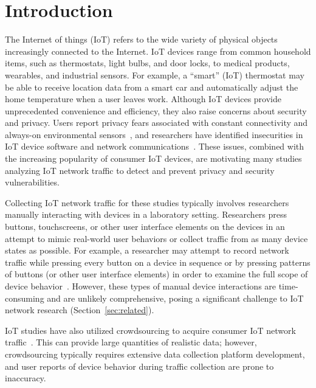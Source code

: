 \section{Introduction}
\label{sec:introduction}
The Internet of things (IoT) refers to the wide variety of physical objects increasingly connected to the Internet. IoT devices range from common household items, such as thermostats, light bulbs, and door locks, to medical products, wearables, and industrial sensors. For example, a ``smart'' (IoT) thermostat may be able to receive location data from a smart car and automatically adjust the home temperature when a user leaves work.
Although IoT devices provide unprecedented convenience and efficiency, they also raise concerns about security and privacy. Users report privacy fears associated with constant connectivity and always-on environmental sensors~\cite{naeini2017privacy, zheng2018user, apthorpe2020you, huang2020amazon}, and researchers have identified insecurities in IoT device software and network communications~\cite{loi2017systematically, chu2018security, wang2019looking}. These issues, combined with the increasing popularity of consumer IoT devices, are motivating many studies analyzing IoT network traffic to detect and prevent privacy and security vulnerabilities. 

Collecting IoT network traffic for these studies typically involves researchers manually interacting with devices in a laboratory setting. Researchers press buttons, touchscreens, or other user interface elements on the devices in an attempt to mimic real-world user behaviors or collect traffic from as many device states as possible. For example, a researcher may attempt to record network traffic while pressing every button on a device in sequence or by pressing patterns of buttons (or other user interface elements) in order to examine the full scope of device behavior~\cite{apthorpe2019keeping}. However, these types of manual device interactions are time-consuming and are unlikely comprehensive, posing a significant challenge to IoT network research (Section~\ref{sec:related}). 

IoT studies have also utilized crowdsourcing to acquire consumer IoT network traffic~\cite{huang2020iot, mazhar2020characterizing}. This can provide large quantities of realistic data; however, crowdsourcing typically requires extensive data collection platform development, and user reports of device behavior during traffic collection are prone to inaccuracy. 

